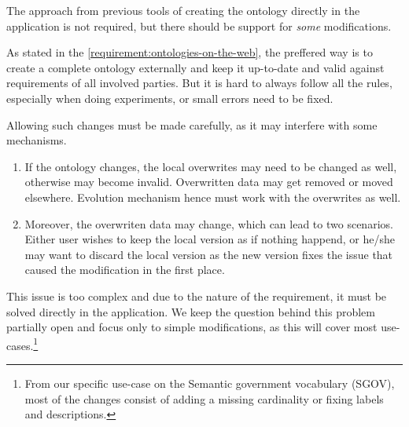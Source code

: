 \begin{requirement}
  \label{requirement:pim-editing}
  The approach from previous tools of creating the ontology directly in the application is not required, but there should be support for \textit{some} modifications.
\end{requirement}

As stated in the \autoref{requirement:ontologies-on-the-web}, the preffered way is to create a complete ontology externally and keep it up-to-date and valid against requirements of all involved parties. But it is hard to always follow all the rules, especially when doing experiments, or small errors need to be fixed.

Allowing such changes must be made carefully, as it may interfere with some mechanisms.
\begin{enumerate}
  \item If the ontology changes, the local overwrites may need to be changed as well, otherwise may become invalid. Overwritten data may get removed or moved elsewhere. Evolution mechanism hence must work with the overwrites as well.
  \item Moreover, the overwriten data may change, which can lead to two scenarios. Either user wishes to keep the local version as if nothing happend, or he/she may want to discard the local version as the new version fixes the issue that caused the modification in the first place.
\end{enumerate}

This issue is too complex and due to the nature of the requirement, it must be solved directly in the application. We keep the question behind this problem partially open and focus only to simple modifications, as this will cover most use-cases.\footnote{From our specific use-case on the Semantic government vocabulary (SGOV), most of the changes consist of adding a missing cardinality or fixing labels and descriptions.}